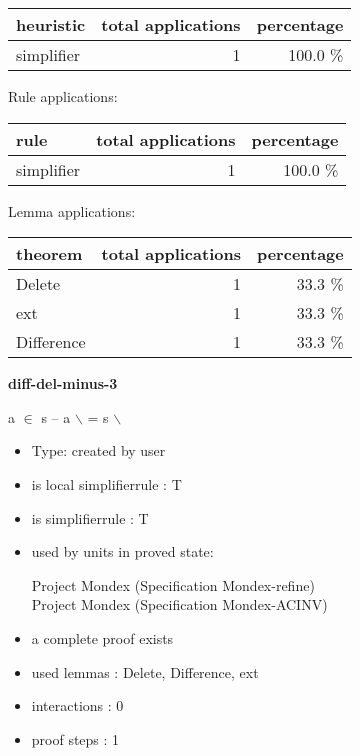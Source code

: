 \documentclass[a4paper]{article}
\begin{document}
\begin{supertabular}{l|r|r}
heuristic	& total applications & percentage \\ \hline
simplifier & 1 & 100.0 \% \\

\end{supertabular}

Rule applications:

\begin{supertabular}{l|r|r}
rule	        & total applications & percentage \\ \hline
simplifier & 1 & 100.0 \% \\

\end{supertabular}

Lemma applications:

\begin{supertabular}{l|r|r}
theorem	        & total applications & percentage \\ \hline
Delete & 1 & 33.3 \% \\
ext & 1 & 33.3 \% \\
Difference & 1 & 33.3 \% \\

\end{supertabular}
\pagebreak

{\LARGE\bf diff-del-minus-3}\label{lemma-diff-del-minus-3}

\medskip

 \Fol a $\in$  \Imp s -- a $\backslash$  = s $\backslash$ 

\begin{itemize}

\item Type: created by user

\item is local simplifierrule : T
\item is simplifierrule : T
\item used by units in proved state:

Project Mondex (Specification Mondex-refine) \\
Project Mondex (Specification Mondex-ACINV)
\item       a complete proof exists
\item       used lemmas  : Delete, Difference, ext
\item       interactions : 0
\item       proof steps  : 1
\end{itemize}
\end{document}
